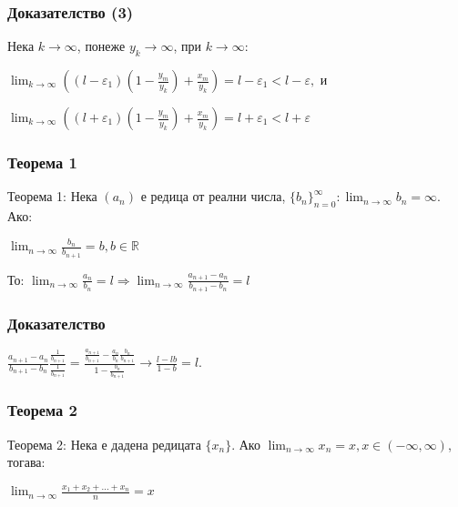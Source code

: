 \documentclass[12pt]{beamer}
\begin{document}
\begin{frame}
\frametitle{Доказателство (3)}
\begin{block}
{}
Нека \(k \to \infty\), понеже \(y_k \to \infty\), при \(k \to \infty\):
\begin{center}
\(
    \displaystyle\lim_{k \to \infty}((l - \varepsilon_1)(1 - \frac{y_m}{y_k}) + \frac{x_m}{y_k}) = l - \varepsilon_1 < l - \varepsilon,
\)
и
\end{center}
\begin{center}
\(
    \displaystyle\lim_{k \to \infty}((l + \varepsilon_1)(1 - \frac{y_m}{y_k}) + \frac{x_m}{y_k}) = l + \varepsilon_1 < l + \varepsilon
\)
\end{center}
\end{block}
\end{frame}

\begin{frame}
\frametitle{Теорема 1}
\begin{block}
{Теорема 1:}
Нека \((a_n)\) е редица от реални числа, \(\displaystyle\{b_n\}_{n=0}^\infty: \lim_{n \to \infty} b_n = \infty\). Ако:
\begin{center}
\(
    \displaystyle\lim_{n \to \infty}\frac{b_n}{b_{n+1}} = b, b \in \mathbb R 
\)
\end{center}
То: \(\displaystyle\lim_{n \to \infty}\frac{a_n}{b_n} = l \Rightarrow \lim_{n \to \infty}\frac{a_{n+1} - a_n}{b_{n+1} - b_n} = l \)
\end{block}
\end{frame}

\begin{frame}
\frametitle{Доказателство}
\begin{block}
{}
\begin{center}
\(
    \displaystyle\frac{a_{n + 1} - a_n}{b_{n+1} - b_n} \frac{\frac{1}{b_{n+1}}}{\frac{1}{b_{n+1}}} = \frac{\frac{a_{n+1}}{b_{n+1}} - \frac{a_n}{b_n}\frac{b_n}{b_{n+1}}}{1 - \frac{b_n}{b_{n+1}}}
    \to
    \frac{l - lb}{1 - b} = l.
\)
\end{center}
\end{block}
\end{frame}

\begin{frame}
\frametitle{Теорема 2}
\begin{block}
{Теорема 2:}
Нека е дадена редицата \(\{x_n\}\). Ако \(\displaystyle\lim_{n \to \infty} x_n = x, x \in (-\infty, \infty)\), тогава:
\begin{center}
\(
    \displaystyle\lim_{n \to \infty} \frac{x_1 + x_2 + ... + x_n}{n} = x
\)
\end{center}
\end{block}
\end{frame}
\end{document}
